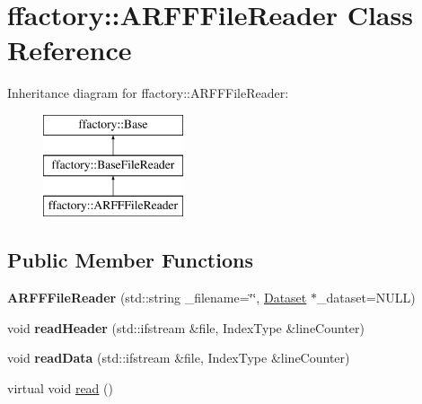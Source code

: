 \hypertarget{classffactory_1_1_a_r_f_f_file_reader}{\section{ffactory\-:\-:A\-R\-F\-F\-File\-Reader Class Reference}
\label{classffactory_1_1_a_r_f_f_file_reader}
}
Inheritance diagram for ffactory\-:\-:A\-R\-F\-F\-File\-Reader\-:\begin{figure}[H]
\begin{center}
\leavevmode
\includegraphics[height=3.000000cm]{classffactory_1_1_a_r_f_f_file_reader}
\end{center}
\end{figure}
\subsection*{Public Member Functions}
\begin{DoxyCompactItemize}
\item 
\hypertarget{classffactory_1_1_a_r_f_f_file_reader_ae3879c91a974667b3d64b1a2ad8a54d7}{{\bfseries A\-R\-F\-F\-File\-Reader} (std\-::string \-\_\-filename=\char`\"{}\char`\"{}, \hyperlink{classffactory_1_1_dataset}{Dataset} $\ast$\-\_\-dataset=N\-U\-L\-L)}\label{classffactory_1_1_a_r_f_f_file_reader_ae3879c91a974667b3d64b1a2ad8a54d7}

\item 
\hypertarget{classffactory_1_1_a_r_f_f_file_reader_a090c45ab33c278ee13f427157afb5188}{void {\bfseries read\-Header} (std\-::ifstream \&file, Index\-Type \&line\-Counter)}\label{classffactory_1_1_a_r_f_f_file_reader_a090c45ab33c278ee13f427157afb5188}

\item 
\hypertarget{classffactory_1_1_a_r_f_f_file_reader_af3c512a28af719e03fcbc3ba428fb1da}{void {\bfseries read\-Data} (std\-::ifstream \&file, Index\-Type \&line\-Counter)}\label{classffactory_1_1_a_r_f_f_file_reader_af3c512a28af719e03fcbc3ba428fb1da}

\item 
virtual void \hyperlink{classffactory_1_1_a_r_f_f_file_reader_ac2fe97202f44108f3379a787962c5721}{read} ()
\end{DoxyCompactItemize}
